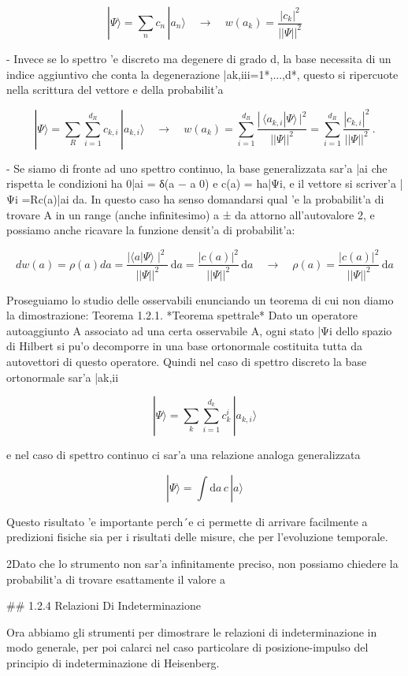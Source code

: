 $$|\Psi\rangle=\sum_{n}c_{n}\,|a_{n}\rangle\quad\longrightarrow\quad w(a_{k})={\frac{|c_{k}|^{2}}{||\Psi||^{2}}}$$

- Invece se lo spettro 'e discreto ma degenere di grado d, la base necessita di un indice aggiuntivo che conta la degenerazione {|ak,iii=1*,...,d*}, questo si ripercuote nella scrittura del vettore e della probabilit'a

$$|\Psi\rangle=\sum_{R}\sum_{i=1}^{d_{R}}c_{k,i}\,|a_{k,i}\rangle\quad\longrightarrow\quad w(a_{k})=\sum_{i=1}^{d_{R}}\frac{|\,\langle a_{k,i}|\Psi\rangle\,|^{2}}{||\Psi||^{2}}=\sum_{i=1}^{d_{R}}\frac{|c_{k,i}|^{2}}{||\Psi||^{2}}\,.$$

- Se siamo di fronte ad uno spettro continuo, la base generalizzata sar'a {|ai} che rispetta le condizioni ha 0|ai = δ(a − a 0) e c(a) = ha|Ψi, e il vettore si scriver'a |Ψi =Rc(a)|ai da. In questo caso ha senso domandarsi qual 'e la probabilit'a di trovare A in un range (anche infinitesimo) a ± da attorno all'autovalore 2, e possiamo anche ricavare la funzione densit'a di probabilit'a:

$$d w(a)=\rho(a)d a={\frac{\mid\langle a|\Psi\rangle\mid^{2}}{||\Psi||^{2}}}\,\mathrm{d}a={\frac{|c(a)|^{2}}{||\Psi||^{2}}}\,\mathrm{d}a\quad\longrightarrow\quad\rho(a)={\frac{|c(a)|^{2}}{||\Psi||^{2}}}\,\mathrm{d}a$$

Proseguiamo lo studio delle osservabili enunciando un teorema di cui non diamo la dimostrazione:
Teorema 1.2.1. *Teorema spettrale* Dato un operatore autoaggiunto A associato ad una certa osservabile A, ogni stato |Ψi dello spazio di Hilbert si pu'o decomporre in una base ortonormale costituita tutta da autovettori di questo operatore. Quindi nel caso di spettro discreto la base ortonormale sar'a |ak,ii

$$|\Psi\rangle=\sum_{k}\sum_{i=1}^{d_{k}}c_{k}^{i}\,|a_{k,i}\rangle$$

e nel caso di spettro continuo ci sar'a una relazione analoga generalizzata

$$|\Psi\rangle=\int\mathrm{d}a\,c\,|a\rangle$$

Questo risultato 'e importante perch´e ci permette di arrivare facilmente a predizioni fisiche sia per i risultati delle misure, che per l'evoluzione temporale.

2Dato che lo strumento non sar'a infinitamente preciso, non possiamo chiedere la probabilit'a di trovare esattamente il valore a

## 1.2.4 Relazioni Di Indeterminazione

Ora abbiamo gli strumenti per dimostrare le relazioni di indeterminazione in modo generale, per poi calarci nel caso particolare di posizione-impulso del principio di indeterminazione di Heisenberg.

